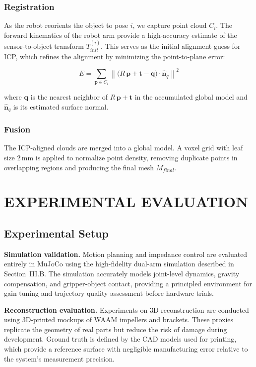 \documentclass[letterpaper, 10 pt, conference]{ieeeconf}  %
\begin{document}
\subsubsection{Registration}
As the robot reorients the object to pose $i$, we capture point cloud
$C_i$. The forward kinematics of the robot arm provide a high-accuracy
estimate of the sensor-to-object transform $T_{init}^{(i)}$. This serves
as the initial alignment guess for ICP, which refines the alignment by
minimizing the point-to-plane error:

\begin{equation}
    E = \sum_{\bm{p} \in C_i}
        \left\lVert \bigl(R\,\bm{p} + \bm{t} - \bm{q}\bigr)
                    \cdot \hat{\bm{n}}_q \right\rVert^2
\end{equation}

where $\bm{q}$ is the nearest neighbor of $R\,\bm{p} + \bm{t}$ in the
accumulated global model and $\hat{\bm{n}}_q$ is its estimated surface
normal.

\subsubsection{Fusion}
The ICP-aligned clouds are merged into a global model. A voxel grid with
leaf size 2\,mm is applied to normalize point density, removing duplicate
points in overlapping regions and producing the final mesh $M_{final}$.


\section{EXPERIMENTAL EVALUATION}

\subsection{Experimental Setup}

\textbf{Simulation validation.}\; Motion planning and impedance control are
evaluated entirely in MuJoCo using the high-fidelity dual-arm simulation
described in Section~III.B. The simulation accurately models joint-level
dynamics, gravity compensation, and gripper-object contact, providing a
principled environment for gain tuning and trajectory quality assessment
before hardware trials.

\textbf{Reconstruction evaluation.}\; Experiments on 3D reconstruction are
conducted using 3D-printed mockups of WAAM impellers and brackets. These
proxies replicate the geometry of real parts but reduce the risk of damage
during development. Ground truth is defined by the CAD models used for
printing, which provide a reference surface with negligible manufacturing
error relative to the system's measurement precision.
\end{document}
